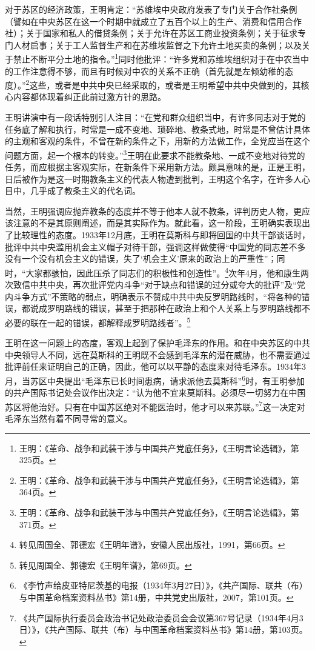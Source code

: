 对于苏区的经济政策，王明肯定：“苏维埃中央政府发表了专门关于合作社条例（譬如在中央苏区在这一个时期中就成立了五百个以上的生产、消费和信用合作社）；关于国家和私人的借贷条例；关于允许在苏区工商业投资条例；关于征求专门人材启事；关于工人监督生产和在苏维埃监督之下允许土地买卖的条例；以及关于禁止不断平分土地的指令。”\footnote{王明：《革命、战争和武装干涉与中国共产党底任务》，《王明言论选辑》，第325页。}同时他批评：“许多党和苏维埃组织对于在中农当中的工作注意得不够，而且有时候对中农的关系不正确（首先就是左倾幼稚的态度）。”\footnote{王明：《革命、战争和武装干涉与中国共产党底任务》，《王明言论选辑》，第364页。}这些，或者是中共中央已经采取的，或者是王明希望中共中央做到的，其核心内容都体现着纠正此前过激方针的思路。


王明讲演中有一段话特别引人注目：“在党和群众组织当中，有许多同志对于党的任务底了解和执行，时常是一成不变地、琐碎地、教条式地，时常是不曾估计具体的主观和客观的条件，不曾在新的条件之下，用新的方法做工作，全党应当在这个问题方面，起一个根本的转变。”\footnote{王明：《革命、战争和武装干涉与中国共产党底任务》，《王明言论选辑》，第371页。}王明在此要求不能教条地、一成不变地对待党的任务，而应根据主客观实际，在新条件下采用新方法。颇具意味的是，正是王明，日后被作为是这一时期教条主义的代表人物遭到批判，王明这个名字，在许多人心目中，几乎成了教条主义的代名词。


当然，王明强调应抛弃教条的态度并不等于他本人就不教条，评判历史人物，更应该注意的不是其原则阐述，而是其实际作为。就此看，这一阶段，王明确实表现出了比较理性的态度。1933年12月底，王明在莫斯科与即将回国的中共干部谈话时，批评中共中央滥用机会主义帽子对待干部，强调这样做使得“中国党的同志差不多没有一个没有机会主义的错误，失了‘机会主义’原来的政治上的严重性”；同时，“大家都骇怕，因此压杀了同志们的积极性和创造性”。\footnote{转见周国全、郭德宏《王明年谱》，安徽人民出版社，1991，第66页。}次年4月，他和康生两次致信中共中央，再次批评党内斗争“对于缺点和错误的过分或夸大的批评”及“党内斗争方式”不策略的弱点，明确表示不赞成中共中央反罗明路线时，“将各种的错误，都说成罗明路线的错误，甚至于把那种在政治上和个人关系上与罗明路线都不必要的联在一起的错误，都解释成罗明路线者”。\footnote{转见周国全、郭德宏《王明年谱》，第69页。}


王明在这一问题上的态度，客观上起到了保护毛泽东的作用。和在中央苏区的中共中央领导人不同，远在莫斯科的王明既不会感到毛泽东的潜在威胁，也不需要通过批评前任来证明自己的正确，因此，他可以以平静的态度来对待毛泽东。1934年3月，当苏区中央提出“毛泽东已长时间患病，请求派他去莫斯科”\footnote{《李竹声给皮亚特尼茨基的电报（1934年3月27日）》，《共产国际、联共（布）与中国革命档案资料丛书》第14册，中共党史出版社，2007，第101页。}时，有王明参加的共产国际书记处会议作出决定：“认为他不宜来莫斯科。必须尽一切努力在中国苏区将他治好。只有在中国苏区绝对不能医治时，他才可以来苏联。”\footnote{《共产国际执行委员会政治书记处政治委员会会议第367号记录（1934年4月3日）》，《共产国际、联共（布）与中国革命档案资料丛书》第14册，第103页。}这一决定对毛泽东当然有着不同寻常的意义。


